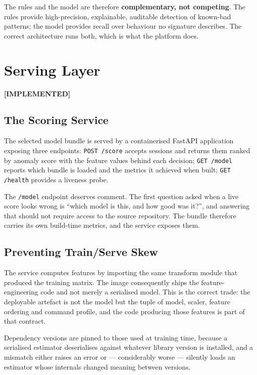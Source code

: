 \documentclass{classeENS}
\providecommand{\statusdone}{\textbf{[IMPLEMENTED]}}
\begin{document}
The rules and the model are therefore \textbf{complementary, not competing}. The rules provide high-precision, explainable, auditable detection of known-bad patterns; the model provides recall over behaviour no signature describes. The correct architecture runs both, which is what the platform does.

\section{Serving Layer}
\label{sec:serving}
\statusdone

\subsection{The Scoring Service}
The selected model bundle is served by a containerised FastAPI application exposing three endpoints: \texttt{POST /score} accepts sessions and returns them ranked by anomaly score with the feature values behind each decision; \texttt{GET /model} reports which bundle is loaded and the metrics it achieved when built; \texttt{GET /health} provides a liveness probe.

The \texttt{/model} endpoint deserves comment. The first question asked when a live score looks wrong is ``which model is this, and how good was it?'', and answering that should not require access to the source repository. The bundle therefore carries its own build-time metrics, and the service exposes them.

\subsection{Preventing Train/Serve Skew}
The service computes features by importing the same transform module that produced the training matrix. The image consequently ships the feature-engineering code and not merely a serialised model. This is the correct trade: the deployable artefact is not the model but the tuple of model, scaler, feature ordering and command profile, and the code producing those features is part of that contract.

Dependency versions are pinned to those used at training time, because a serialised estimator deserialises against whatever library version is installed, and a mismatch either raises an error or --- considerably worse --- silently loads an estimator whose internals changed meaning between versions.
\end{document}
